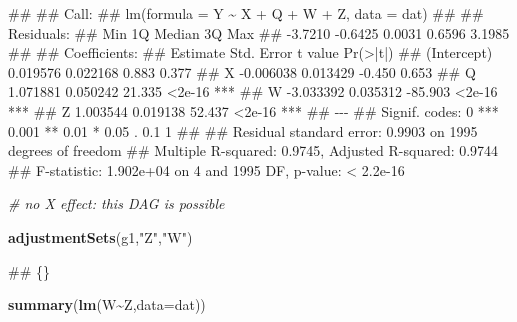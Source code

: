 \documentclass[
]{book}
\newenvironment{Shaded}{\begin{snugshade}}{\end{snugshade}}
\newcommand{\AttributeTok}[1]{\textcolor[rgb]{0.13,0.29,0.53}{#1}}
\newcommand{\CommentTok}[1]{\textcolor[rgb]{0.56,0.35,0.01}{\textit{#1}}}
\newcommand{\FunctionTok}[1]{\textcolor[rgb]{0.13,0.29,0.53}{\textbf{#1}}}
\newcommand{\NormalTok}[1]{#1}
\newcommand{\SpecialCharTok}[1]{\textcolor[rgb]{0.81,0.36,0.00}{\textbf{#1}}}
\newcommand{\StringTok}[1]{\textcolor[rgb]{0.31,0.60,0.02}{#1}}
\begin{document}
\begin{Shaded}
\begin{Highlighting}[]
\NormalTok{\#\# }
\NormalTok{\#\# Call:}
\NormalTok{\#\# lm(formula = Y \textasciitilde{} X + Q + W + Z, data = dat)}
\NormalTok{\#\# }
\NormalTok{\#\# Residuals:}
\NormalTok{\#\#     Min      1Q  Median      3Q     Max }
\NormalTok{\#\# {-}3.7210 {-}0.6425  0.0031  0.6596  3.1985 }
\NormalTok{\#\# }
\NormalTok{\#\# Coefficients:}
\NormalTok{\#\#              Estimate Std. Error t value Pr(\textgreater{}|t|)    }
\NormalTok{\#\# (Intercept)  0.019576   0.022168   0.883    0.377    }
\NormalTok{\#\# X           {-}0.006038   0.013429  {-}0.450    0.653    }
\NormalTok{\#\# Q            1.071881   0.050242  21.335   \textless{}2e{-}16 ***}
\NormalTok{\#\# W           {-}3.033392   0.035312 {-}85.903   \textless{}2e{-}16 ***}
\NormalTok{\#\# Z            1.003544   0.019138  52.437   \textless{}2e{-}16 ***}
\NormalTok{\#\# {-}{-}{-}}
\NormalTok{\#\# Signif. codes:  0 \textquotesingle{}***\textquotesingle{} 0.001 \textquotesingle{}**\textquotesingle{} 0.01 \textquotesingle{}*\textquotesingle{} 0.05 \textquotesingle{}.\textquotesingle{} 0.1 \textquotesingle{} \textquotesingle{} 1}
\NormalTok{\#\# }
\NormalTok{\#\# Residual standard error: 0.9903 on 1995 degrees of freedom}
\NormalTok{\#\# Multiple R{-}squared:  0.9745, Adjusted R{-}squared:  0.9744 }
\NormalTok{\#\# F{-}statistic: 1.902e+04 on 4 and 1995 DF,  p{-}value: \textless{} 2.2e{-}16}
\end{Highlighting}
\end{Shaded}

\begin{Shaded}
\begin{Highlighting}[]
\CommentTok{\# no X effect: this DAG is possible}

\FunctionTok{adjustmentSets}\NormalTok{(g1,}\StringTok{"Z"}\NormalTok{,}\StringTok{"W"}\NormalTok{)}
\end{Highlighting}
\end{Shaded}

\begin{Shaded}
\begin{Highlighting}[]
\NormalTok{\#\#  \{\}}
\end{Highlighting}
\end{Shaded}

\begin{Shaded}
\begin{Highlighting}[]
\FunctionTok{summary}\NormalTok{(}\FunctionTok{lm}\NormalTok{(W}\SpecialCharTok{\textasciitilde{}}\NormalTok{Z,}\AttributeTok{data=}\NormalTok{dat))}
\end{Highlighting}
\end{Shaded}
\end{document}

